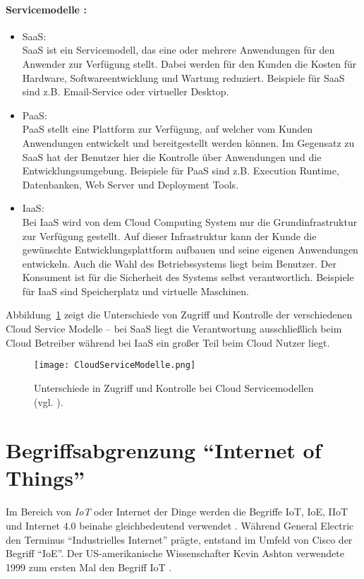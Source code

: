 \paragraph{Servicemodelle \parencite{jansen2011sp}:}
\begin{itemize}
\item \ac{SaaS}:\\ 
\ac{SaaS} ist ein Servicemodell, das eine oder mehrere Anwendungen für den Anwender zur Verfügung stellt. Dabei werden für den Kunden die Kosten für Hardware, Softwareentwicklung und Wartung reduziert. Beispiele für \ac{SaaS} sind z.B. Email-Service oder virtueller Desktop.
\item \ac{PaaS}:\\
\ac{PaaS} stellt eine Plattform zur Verfügung, auf welcher vom Kunden Anwendungen entwickelt und bereitgestellt werden können. Im Gegensatz zu \ac{SaaS} hat der Benutzer hier die Kontrolle über Anwendungen und die Entwicklungsumgebung. Beispiele für \ac{PaaS} sind z.B. Execution Runtime, Datenbanken, Web Server und Deployment Tools.
\item \ac{IaaS}:\\
Bei \ac{IaaS} wird von dem Cloud Computing System nur die Grundinfrastruktur zur Verfügung gestellt. Auf dieser Infrastruktur kann der Kunde die gewünschte Entwicklungsplattform aufbauen und seine eigenen Anwendungen entwickeln. Auch die Wahl des Betriebssystems liegt beim Benutzer. Der Konsument ist für die Sicherheit des Systems selbst verantwortlich. Beispiele für \ac{IaaS} sind Speicherplatz und virtuelle Maschinen.
\end{itemize}
\vspace{\baselineskip}

Abbildung~\ref{fig:cloud} zeigt die Unterschiede von Zugriff und Kontrolle der verschiedenen Cloud Service Modelle -- bei \ac{SaaS} liegt die Verantwortung ausschließlich beim Cloud Betreiber während bei \ac{IaaS} ein großer Teil beim Cloud Nutzer liegt.

\begin{figure}%
\centering
\texttt{[image: CloudServiceModelle.png]} 
\caption{Unterschiede in Zugriff und Kontrolle bei Cloud Servicemodellen (vgl. \cite{gilchrist2016industry}).}
\label{fig:cloud}
\end{figure}

\section{Begriffsabgrenzung "`Internet of Things"'}
Im Bereich von \textit{\ac{IoT}} oder Internet der Dinge werden die Begriffe \ac{IoT}, \acl{IoE}, \acl{IIoT} und Internet 4.0 beinahe gleichbedeutend verwendet \parencite{gilchrist2016industry, stackowiak2015big}. Während General Electric den Terminus "`Industrielles Internet"' prägte, entstand im Umfeld von Cisco der Begriff "`\ac{IoE}"'. Der US-amerikanische Wissenschafter Kevin Ashton verwendete 1999 zum ersten Mal den Begriff \ac{IoT} \parencite{ashton2011internet}. 

